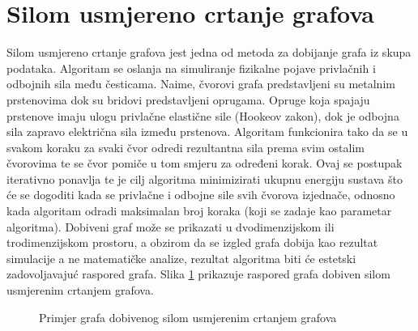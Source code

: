 \documentclass[times, utf8, zavrsni, numeric]{fer}
\begin{document}
\section{Silom usmjereno crtanje grafova}
\label{subchap:forcedir}
Silom usmjereno crtanje grafova jest jedna od metoda za dobijanje grafa iz skupa podataka. Algoritam se oslanja na simuliranje fizikalne pojave privlačnih i odbojnih sila među česticama. Naime, čvorovi grafa predstavljeni su metalnim prstenovima dok su bridovi predstavljeni oprugama. Opruge koja spajaju prstenove imaju ulogu privlačne elastične sile (Hookeov zakon), dok je odbojna sila zapravo električna sila između prstenova. Algoritam funkcionira tako da se u svakom koraku za svaki čvor odredi rezultantna sila prema svim ostalim čvorovima te se čvor pomiče u tom smjeru za određeni korak. Ovaj se postupak iterativno ponavlja te je cilj algoritma minimizirati ukupnu energiju sustava što će se dogoditi kada se privlačne i odbojne sile svih čvorova izjednače, odnosno kada algoritam odradi maksimalan broj koraka (koji se zadaje kao parametar algoritma). Dobiveni graf može se prikazati u dvodimenzijskom ili trodimenzijskom prostoru, a obzirom da se izgled grafa dobija kao rezultat simulacije a ne matematičke analize, rezultat algoritma biti će estetski zadovoljavajuć raspored grafa. Slika \ref{img:fdgd_example} prikazuje raspored grafa dobiven silom usmjerenim crtanjem grafova.

\begin{figure}
\caption{Primjer grafa dobivenog silom usmjerenim crtanjem grafova}
\label{img:fdgd_example}
\end{figure}
\end{document}
